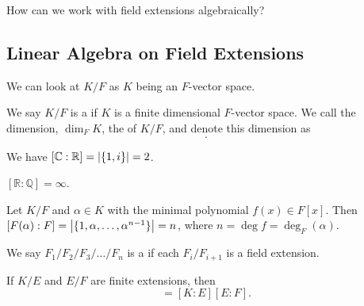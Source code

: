 \documentclass[notoc,notitlepage,nobib]{tufte-book}
\begin{document}
How can we work with field extensions algebraically?

\subsection{Linear Algebra on Field Extensions}%
\label{sub:linear_algebra_on_field_extensions}

We can look at $K / F$ as $K$ being an $F$-vector space.

\begin{defn}\label{defn:finite_extension}
  We say $K / F$ is a  if $K$ is a finite dimensional $F$-vector space.
  We call the dimension, $\dim_F K$, the  of $K / F$, and denote this dimension as
  \begin{equation*}
    [ K : F ].
  \end{equation*}
\end{defn}

\begin{eg}
  We have $[ \mathbb{C} : \mathbb{R} ] = \left| \{ 1, i \} \right| = 2$.
\end{eg}

\begin{eg}
  $[ \mathbb{R} : \mathbb{Q} ] = \infty$.
\end{eg}

\begin{eg}
  Let $K / F$ and $\alpha \in K$ with the minimal polynomial $f(x) \in F[x]$.
  Then $[ F(\alpha) : F ] = \left| \{ 1, \alpha, \ldots, \alpha^{n - 1} \} \right| = n$,
  where $n = \deg f = \deg_F(\alpha)$.
\end{eg}

\begin{defn}\label{defn:tower_of_fields}
  We say $F_1 / F_2 / F_3 / \hdots / F_n$ is a  if each $F_i / F_{i + 1}$
  is a field extension.
\end{defn}

\begin{thm}\label{thm:tower_theorem}
  If $K / E$ and $E / F$ are finite extensions, then
  \begin{equation*}
    [K : F] = [K : E] [E : F].
  \end{equation*}
\end{thm}
\end{document}
